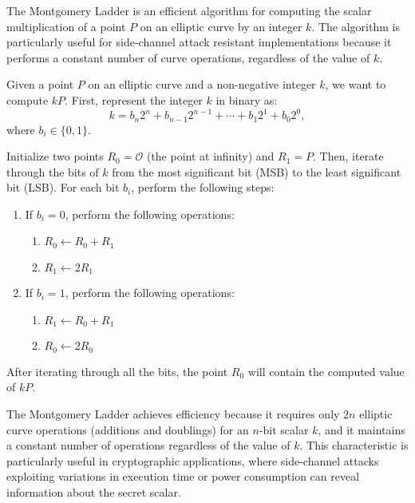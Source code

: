 \documentclass[12pt,openany]{book}
\theoremstyle{definition}
\begin{document}
	The Montgomery Ladder is an efficient algorithm for computing the scalar multiplication of a point $P$ on an elliptic curve by an integer $k$. The algorithm is particularly useful for side-channel attack resistant implementations because it performs a constant number of curve operations, regardless of the value of $k$.
	
	Given a point $P$ on an elliptic curve and a non-negative integer $k$, we want to compute $kP$. First, represent the integer $k$ in binary as:
	\[
	k = b_n 2^n + b_{n-1} 2^{n-1} + \cdots + b_1 2^1 + b_0 2^0,
	\]
	where $b_i \in \{0, 1\}$.
	
	Initialize two points $R_0 = \mathcal{O}$ (the point at infinity) and $R_1 = P$. Then, iterate through the bits of $k$ from the most significant bit (MSB) to the least significant bit (LSB). For each bit $b_i$, perform the following steps:
	
	\begin{enumerate}
		\item If $b_i = 0$, perform the following operations:
		\begin{enumerate}
			\item $R_0 \leftarrow R_0 + R_1$
			\item $R_1 \leftarrow 2R_1$
		\end{enumerate}
		\item If $b_i = 1$, perform the following operations:
		\begin{enumerate}
			\item $R_1 \leftarrow R_0 + R_1$
			\item $R_0 \leftarrow 2R_0$
		\end{enumerate}
	\end{enumerate}
	
	After iterating through all the bits, the point $R_0$ will contain the computed value of $kP$.
	
	The Montgomery Ladder achieves efficiency because it requires only $2n$ elliptic curve operations (additions and doublings) for an $n$-bit scalar $k$, and it maintains a constant number of operations regardless of the value of $k$. This characteristic is particularly useful in cryptographic applications, where side-channel attacks exploiting variations in execution time or power consumption can reveal information about the secret scalar.
	
\end{document}

